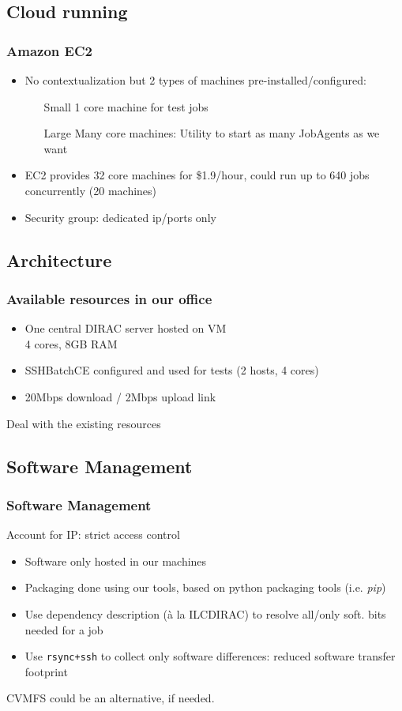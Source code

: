 \documentclass[14pt]{beamer}
\begin{document}
\subsection{Cloud running}
\begin{frame}
\frametitle{Amazon EC2}
\begin{itemize}
\setlength{\itemindent}{-1.2em}
\item {\color{blue}No contextualization} but 2 types of machines pre-installed/configured:
\begin{itemize}
\item[Small] 1 core machine for test jobs
\item[Large] Many core machines: Utility to start as many JobAgents as we want
\end{itemize}
\item EC2 provides 32 core machines for \$1.9/hour, could run \alert{up to 640 jobs concurrently} (20 machines)
\item Security group: dedicated ip/ports only
\end{itemize}
\end{frame}

\subsection{Architecture}
\begin{frame}
\frametitle{Available resources in our office}
\begin{itemize}
\setlength{\itemindent}{-1.2em}
\item One central DIRAC server hosted on VM \\ 4 cores, 8GB RAM
\item SSHBatchCE configured and used for tests (2 hosts, 4 cores)
\item 20Mbps download / 2Mbps upload link
\end{itemize}
\alert{Deal with the existing resources}
\end{frame}

\subsection{Software Management}
\begin{frame}
\frametitle{Software Management}
\alert{Account for IP}: strict access control
\begin{itemize}
\setlength{\itemindent}{-1.2em}
\item Software only hosted in our machines
\item Packaging done using our tools, based on python packaging tools (i.e. \emph{pip})
\item Use dependency description (\`a la ILCDIRAC) to resolve all/only soft. bits needed for a job
\item Use \texttt{rsync+ssh} to collect only software differences: reduced software transfer footprint
\end{itemize}
{\color{blue} CVMFS could be an alternative}, if needed.
\end{frame}
\end{document}
